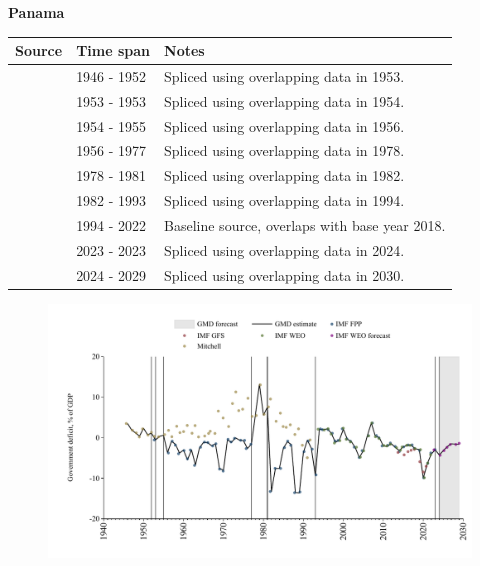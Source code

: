 \documentclass[12pt,a4paper,landscape]{article}
\begin{document}
\begin{adjustbox}{max totalsize={\paperwidth}{\paperheight},center}
\begin{minipage}[t][\textheight][t]{\textwidth}
\vspace*{0.5cm}
{}
\begin{center}
{\Large\bfseries Panama}
\end{center}
\vspace{0.5cm}
\begin{table}[H]
\centering
\small
\begin{tabular}{|l|l|l|}
\hline
\textbf{Source} & \textbf{Time span} & \textbf{Notes} \\
\hline
\rowcolor{white}\cite{Mitchell}& 1946 - 1952 &Spliced using overlapping data in 1953.\\
\rowcolor{lightgray}\cite{IMF_FPP}& 1953 - 1953 &Spliced using overlapping data in 1954.\\
\rowcolor{white}\cite{Mitchell}& 1954 - 1955 &Spliced using overlapping data in 1956.\\
\rowcolor{lightgray}\cite{IMF_FPP}& 1956 - 1977 &Spliced using overlapping data in 1978.\\
\rowcolor{white}\cite{Mitchell}& 1978 - 1981 &Spliced using overlapping data in 1982.\\
\rowcolor{lightgray}\cite{IMF_FPP}& 1982 - 1993 &Spliced using overlapping data in 1994.\\
\rowcolor{white}\cite{IMF_WEO}& 1994 - 2022 &Baseline source, overlaps with base year 2018.\\
\rowcolor{lightgray}\cite{IMF_FPP}& 2023 - 2023 &Spliced using overlapping data in 2024.\\
\rowcolor{white}\cite{IMF_WEO_forecast}& 2024 - 2029 &Spliced using overlapping data in 2030.\\
\hline
\end{tabular}
\end{table}
\begin{figure}[H]
\centering
\includegraphics[width=\textwidth,height=0.6\textheight,keepaspectratio]{graphs/PAN_govdef_GDP.pdf}
\end{figure}
\end{minipage}
\end{adjustbox}
\end{document}
